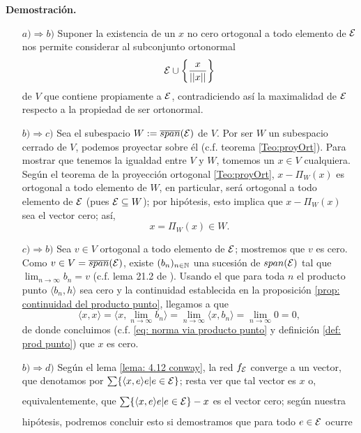 \noindent
\textbf{Demostración.}
\begin{itemize}

\item[$a) \Rightarrow b)$] Suponer la existencia de un 
$x$ no cero ortogonal a todo elemento de $\mathcal{E}$
nos permite considerar al subconjunto ortonormal
\[
\mathcal{E} \cup \left\{ \frac{x}{||x||} \right\}
\]
de $V$
que contiene propiamente a $\mathcal{E}$,
contradiciendo así la maximalidad de $\mathcal{E}$
respecto a la propiedad de ser ortonormal.

\item[$b) \Rightarrow c)$] Sea el subespacio
$W := \overline{span}(\mathcal{E})$ de $V$. Por ser
$W$ un subespacio cerrado de $V$, podemos proyectar
sobre él (c.f. teorema \ref{Teo:proyOrt}).
Para mostrar que tenemos la igualdad entre
$V$ y $W$, tomemos un $x \in V$ cualquiera.
Según el teorema de la proyección ortogonal 
\ref{Teo:proyOrt}, $x-\Pi_{W}(x)$
es ortogonal a todo elemento de $W$, 
en particular, será ortogonal a todo elemento de
$\mathcal{E}$ (pues $\mathcal{E} \subseteq W$);
por hipótesis, esto implica que $x-\Pi_{W}(x)$ sea el vector cero;
así,
\[
x = \Pi_{W}(x) \in W.
\]

\item[$c) \Rightarrow b)$] Sea $v \in V$
ortogonal a todo elemento de $\mathcal{E}$; mostremos que
$v$ es cero. Como $v \in V = \overline{span}(\mathcal{E})$,
existe $(b_{n})_{n \in \mathbb{N}}$ una sucesión de
$span(\mathcal{E})$ tal que
$\lim_{n \rightarrow \infty}b_{n}=v$ 
(c.f. lema 21.2 de \cite{munkres}).
Usando el que para toda $n$ el producto punto 
$\langle b_{n}, h \rangle$
sea cero y la continuidad
establecida en la proposición \ref{prop: continuidad del producto punto},
llegamos a que
\[
\langle x,x \rangle= \langle x, \lim_{n \rightarrow \infty}b_{n} \rangle= 
\lim_{n \rightarrow \infty} \langle x, b_{n} \rangle= 
\lim_{n \rightarrow \infty} 0 = 0,
\]
de donde concluimos 
(c.f. \eqref{eq: norma via producto punto} y 
definición \ref{def: prod punto})
que $x$ es cero.
 

\item[$b) \Rightarrow d)$] Según el lema \ref{lema: 4.12 conway},
la red $f_{\mathcal{E}}$ converge a un vector, que denotamos por 
$\sum\limits_{}^{}\{ \langle x,e \rangle e | e \in \mathcal{E} \}$;
resta ver que tal 
vector es $x$
o, equivalentemente, que
$
\sum\limits_{}^{}\{ \langle x,e \rangle e | e \in \mathcal{E} \} -x
$
es el vector cero; según nuestra hipótesis, podremos
concluir esto si demostramos que para todo $e \in \mathcal{E}$
ocurre


\end{itemize}
